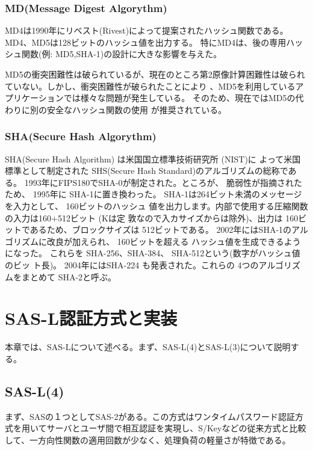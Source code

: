 \documentclass{thesis}
\begin{document}
\subsection{MD(Message Digest Algorythm)}
MD4\cite{ハッシュ関数}は1990年にリベスト(Rivest)によって提案されたハッシュ関数である。 MD4、MD5は128ビットのハッシュ値を出力する。
特にMD4は、後の専用ハッシュ関数(例: MD5,SHA-1)の設計に大きな影響を与えた。

MD5の衝突困難性は破られているが、現在のところ第2原像計算困難性は破られていない。しかし、衝突困難性が破られたことにより 、MD5を利用しているアプリケーションでは様々な問題が発生している。 そのため、現在ではMD5の代わりに別の安全なハッシュ関数の使用 が推奨されている。
\subsection{SHA(Secure Hash Algorythm)}
SHA(Secure Hash Algorithm)\cite{ハッシュ関数} は米国国立標準技術研究所 (NIST)に よって米国標準として制定された SHS(Secure Hash Standard)のアルゴリズムの総称である。 1993年にFIPS180でSHA-0が制定された。ところが、
脆弱性が指摘されたため、 1995年に SHA-1に置き換わった。 SHA-1は264ビット未満のメッセージを入力として、 160ビットのハッシュ 値を出力します。内部で使用する圧縮関数の入力は160+512ビット (Kは定 敦なので入カサイズからは除外)、出力は 160ビットであるため、ブロックサイズは 512ビットである。 2002年にはSHA-1のアルゴリズムに改良が加えられ、 160ビットを超える
ハッシュ値を生成できるようになった。 これらを SHA-256、SHA-384、 SHA-512という(数字がハッシュ値のビッ ト長)。 2004年にはSHA-224 も発表された。これらの 4つのアルゴリズムをまとめて SHA-2と呼ぶ。

\chapter{SAS-L認証方式と実装}
本章では、SAS-L\cite{SAS-Lワンタイムパスワード認証方式について}\cite{SAS}について述べる。まず、SAS-L(4)\cite{SAS}とSAS-L(3)\cite{SAS}について説明する。
\section{SAS-L(4)}
まず、SASの１つとしてSAS-2がある。この方式はワンタイムパスワード認証方式を用いてサーバとユーザ間で相互認証を実現し、S/Keyなどの従来方式と比較して、一方向性関数の適用回数が少なく、処理負荷の軽量さが特徴である。
\end{document}
